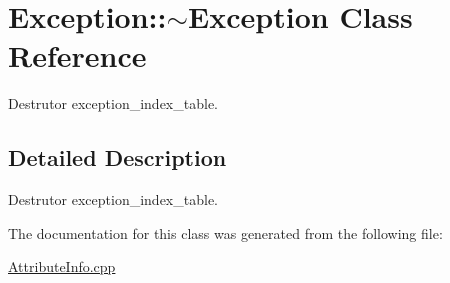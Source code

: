 \hypertarget{class_exception_1_1~_exception}{}\section{Exception\+:\+:$\sim$\+Exception Class Reference}
\label{class_exception_1_1~_exception}


Destrutor exception\+\_\+index\+\_\+table.  




\subsection{Detailed Description}
Destrutor exception\+\_\+index\+\_\+table. 

The documentation for this class was generated from the following file\+:\begin{DoxyCompactItemize}
\item 
\hyperlink{_attribute_info_8cpp}{Attribute\+Info.\+cpp}\end{DoxyCompactItemize}
